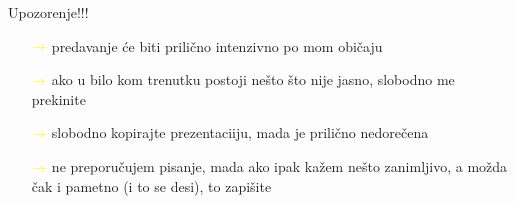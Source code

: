 {
    \newcommand{\yarr}{$\color{yellow}{\rightarrow}$}
    \begin{frame}[plain]
        \begin{center}
            \huge{Upozorenje!!!}
        \end{center}
        \begin{itemize}
            \pause
            \item[\yarr] predavanje će biti prilično intenzivno po mom običaju
            \pause
            \item[\yarr] ako u bilo kom trenutku postoji nešto što nije jasno, slobodno me prekinite
            \pause
            \item[\yarr] slobodno kopirajte prezentaciiju, mada je prilično nedorečena
            \pause
            \item[\yarr] ne preporučujem pisanje, mada ako ipak kažem nešto zanimljivo, a možda
                čak i pametno (i to se desi), to zapišite
        \end{itemize}
    \end{frame}
}

